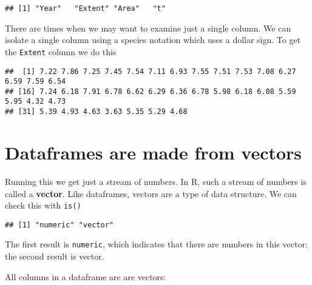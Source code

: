 \documentclass[
]{book}
\newenvironment{Shaded}{\begin{snugshade}}{\end{snugshade}}
\newcommand{\FunctionTok}[1]{\textcolor[rgb]{0.00,0.00,0.00}{#1}}
\newcommand{\NormalTok}[1]{#1}
\newcommand{\SpecialCharTok}[1]{\textcolor[rgb]{0.00,0.00,0.00}{#1}}
\begin{document}
\begin{verbatim}
## [1] "Year"   "Extent" "Area"   "t"
\end{verbatim}

There are times when we may want to examine just a single column. We can isolate a single column using a species notation which uses a dollar sign. To get the \texttt{Extent} column we do this

\begin{Shaded}
\end{Shaded}

\begin{verbatim}
##  [1] 7.22 7.86 7.25 7.45 7.54 7.11 6.93 7.55 7.51 7.53 7.08 6.27 6.59 7.59 6.54
## [16] 7.24 6.18 7.91 6.78 6.62 6.29 6.36 6.78 5.98 6.18 6.08 5.59 5.95 4.32 4.73
## [31] 5.39 4.93 4.63 3.63 5.35 5.29 4.68
\end{verbatim}

\hypertarget{dataframes-are-made-from-vectors}{%
\section{Dataframes are made from vectors}\label{dataframes-are-made-from-vectors}}

Running this we get just a stream of numbers. In R, such a stream of numbers is called a \textbf{vector}. Like dataframes, vectors are a type of data structure. We can check this with \texttt{is()}

\begin{Shaded}
\end{Shaded}

\begin{verbatim}
## [1] "numeric" "vector"
\end{verbatim}

The first result is \texttt{numeric}, which indicates that there are numbers in this vector; the second result is vector.

All columns in a dataframe are are vectors:

\begin{Shaded}
\end{Shaded}
\end{document}
